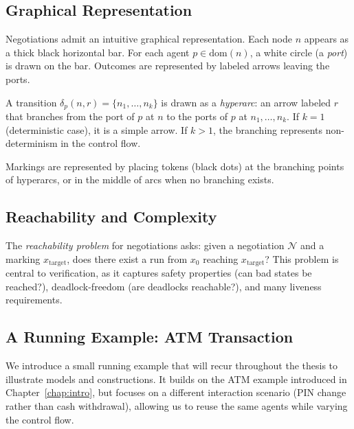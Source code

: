 
\subsection{Graphical Representation}

Negotiations admit an intuitive graphical representation. Each node $n$ appears as a thick black horizontal bar. For each agent $p \in \text{dom}(n)$, a white circle (a \emph{port}) is drawn on the bar. Outcomes are represented by labeled arrows leaving the ports.

A transition $\delta_p(n,r) = \{n_1, \ldots, n_k\}$ is drawn as a \emph{hyperarc}: an arrow labeled $r$ that branches from the port of $p$ at $n$ to the ports of $p$ at $n_1, \ldots, n_k$. If $k = 1$ (deterministic case), it is a simple arrow. If $k > 1$, the branching represents non-determinism in the control flow.

Markings are represented by placing tokens (black dots) at the branching points of hyperarcs, or in the middle of arcs when no branching exists.


\subsection{Reachability and Complexity}
\label{sec:reachability}

The \emph{reachability problem} for negotiations asks: given a negotiation $\mathcal{N}$ and a marking $x_{\text{target}}$, does there exist a run from $x_0$ reaching $x_{\text{target}}$? This problem is central to verification, as it captures safety properties (can bad states be reached?), deadlock-freedom (are deadlocks reachable?), and many liveness requirements.


\subsection{A Running Example: ATM Transaction}
\label{sec:running-example}

We introduce a small running example that will recur throughout the thesis to illustrate models and constructions. It builds on the ATM example introduced in Chapter~\ref{chap:intro}, but focuses on a different interaction scenario (PIN change rather than cash withdrawal), allowing us to reuse the same agents while varying the control flow.

